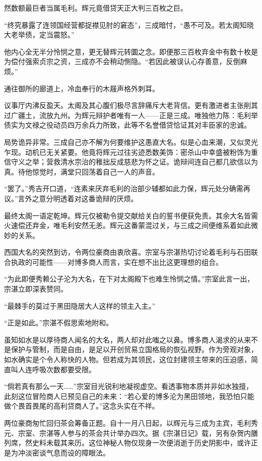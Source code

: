\documentclass[
]{book}
\begin{document}
然数额最巨者当属毛利。辉元竟借贷天正大判三百枚之巨。

``终究暴露了连领国经营都捉襟见肘的窘态''，三成暗忖，``愚不可及。若太阁知晓大老举债，定当震怒。''

他内心全无半分怜悯之意，更无替辉元转圜之念。即便那三百枚弃金中有数十枚是为偿付强索贞宗之资，三成亦不会稍动恻隐。``若因此被误认心存善意，反倒麻烦。''

通往御所的廊道上，冷血奉行的木屐声格外刺耳。

议事厅内沸反盈天。太阁及其心腹们极尽言辞痛斥大老背信。更有激进者主张削其过广疆土，流放九州。为辉元辩护者唯有一人------正是三成。唯独他力陈：毛利举债实为文禄之役动员四万余兵力所致，此等不名誉借贷恰证其对丰臣家的忠诚。

局势诡异非常。三成自己亦不解为何要维护这愚直大名。似是心血来潮，又似灵光乍现。动机已无关紧要。他竟将辉元过往劣迹悉数美饰：密杀山中幸盛被粉饰为重信守义之举；营救清水宗治的稚拙反成慈悲为怀之证。诡辩间连自己都几欲信以为真。待他惊觉时，满堂只回荡着自己一人的声音。

``罢了。''秀吉开口道，``连素来厌弃毛利的治部少辅都如此力保，辉元处分确需再议。''言外之意分明透着对这番诡辩的厌烦。

最终太阁一语定乾坤。辉元仅被勒令提交献给关白的誓书便获免责。其余大名皆需火速偿还弃金，唯毛利安然无恙。辉元这番蒙混过关，与三成之间便维系着如此微妙的关系。

西国大名的突然到访，令两位豪商由衷欣喜。宗室与宗湛热切讨论着毛利与石田联合执政的可能性------对博多商人而言，实在想不出比这更理想的组合。

``为此即便秀赖公子沦为大名，在下对太阁殿下也难生怜悯之情。''宗室此言一出，宗湛立即深表赞同。

``最棘手的莫过于黑田隐居大人这样的领主入主。''

``正是如此。''宗湛不假思索地附和。

虽知如水是以厚待商人闻名的大名，两人却对此嗤之以鼻。博多商人渴求的从来不是保护与管制，而是自由，是足以开创贸易立国格局的恢弘视野。作为旁观对象，如水确实是个令人称快的人物。但若成为其领民，这位封建领主带来的压迫感，简直叫人连呼吸次数都要受限。

``倘若真有那么一天\ldots\ldots{}''宗室目光锐利地凝视虚空。看透事物本质并非如水独擅，此刻这位冒险商人已预见自己的未来：``若心爱的博多沦为黑田领地，我恐怕只能做个畏首畏尾的高利贷商人了。''这念头实在不祥。

两位豪商匆忙回归茶会筹备正题。自十一月八日起，以辉元与三成为主宾，毛利秀元、宗室、宗湛等人参与的茶会共计举办四次。据《宗湛日记》载，另有杂贺内膳列席，然史料未载其来历。这位神秘人物仅现身一次便消逝于历史阴影中，或许正是为冲淡密谈气息而设的障眼法。
\end{document}
